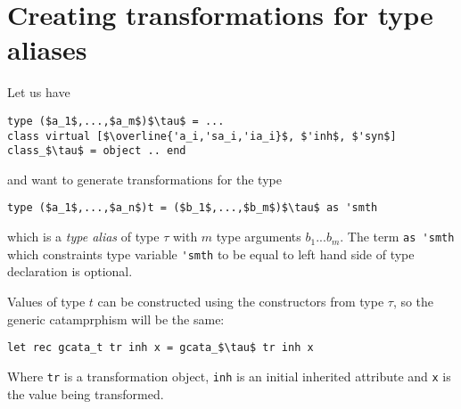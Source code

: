 \documentclass[acmsmall,review,anonymous]{acmart}\settopmatter{printfolios=true,printccs=false,printacmref=false}
\begin{document}
\section{Creating transformations for type aliases}
Let us have
\begin{lstlisting}
type ($a_1$,...,$a_m$)$\tau$ = ...
class virtual [$\overline{'a_i,'sa_i,'ia_i}$, $'inh$, $'syn$] class_$\tau$ = object .. end
\end{lstlisting}
and want to generate transformations for the type
\begin{lstlisting}
type ($a_1$,...,$a_n$)t = ($b_1$,...,$b_m$)$\tau$ as 'smth
\end{lstlisting}
which is a \textit{type alias} of type $\tau$ with $m$ type arguments $b_1$...$b_m$. The term \lstinline{as 'smth} which constraints type variable \lstinline{'smth} to be equal to left hand side of type declaration is optional.

Values of type $t$ can be constructed using the constructors from type $\tau$, so the generic catamprphism will be the same:
\begin{lstlisting}
let rec gcata_t tr inh x = gcata_$\tau$ tr inh x
\end{lstlisting}
Where \lstinline{tr} is a transformation object, \lstinline{inh} is an initial inherited attribute and \lstinline{x} is the value being transformed.
\end{document}
